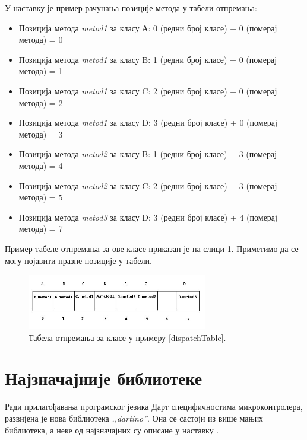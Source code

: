 \documentclass[12pt,oneside]{memoir}
\begin{document}
У наставку је пример рачунања позиције метода у табели отпремања:
\begin{itemize}
\item Позиција метода \textit{metod1} за класу А: 0 (редни број класе) + 0 (померај метода) = 0
\item Позиција метода \textit{metod1} за класу B: 1 (редни број класе) + 0 (померај метода) = 1
\item Позиција метода \textit{metod1} за класу C: 2 (редни број класе) + 0 (померај метода) = 2
\item Позиција метода \textit{metod1} за класу D: 3 (редни број класе) + 0 (померај метода) = 3
\item Позиција метода \textit{metod2} за класу B: 1 (редни број класе) + 3 (померај метода) = 4
\item Позиција метода \textit{metod2} за класу C: 2 (редни број класе) + 3 (померај метода) = 5
\item Позиција метода \textit{metod3} за класу D: 3 (редни број класе) + 4 (померај метода) = 7
\end{itemize}

Пример табеле отпремања за ове класе приказан је на слици \ref{fig:otpremanje}. Приметимо да се могу појавити празне позиције у табели.

\begin{figure}[!ht]
  \centering
  \includegraphics[width=0.7\textwidth]{otpremanje.jpg}
  \caption{Табела отпремања за класе у примеру \ref{dispatchTable}.}
  \label{fig:otpremanje}
\end{figure}

\section{Најзначајније библиотеке}
\label{biblioteke}
Ради прилагођавања програмског језика Дарт специфичностима микроконтролера, развијена је нова библиотека \textit{,,dartino''}. Она се састоји из више мањих библиотека, а неке од најзначајних су описане у наставку  \cite{biblioteke}.
\end{document}
